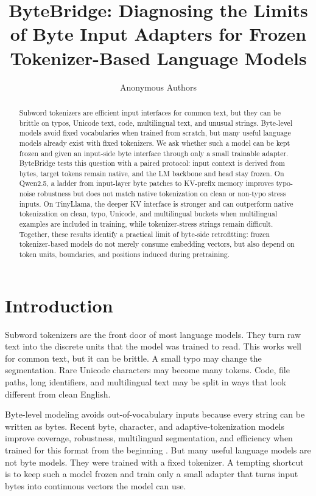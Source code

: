\documentclass[runningheads]{llncs}
\title{ByteBridge: Diagnosing the Limits of Byte Input Adapters for Frozen Tokenizer-Based Language Models}
\author{Anonymous Authors}
\institute{Paper under double-anonymous review}
\begin{document}
\maketitle

\begin{abstract}
Subword tokenizers are efficient input interfaces for common text, but they can be brittle on typos, Unicode text, code, multilingual text, and unusual strings. Byte-level models avoid fixed vocabularies when trained from scratch, but many useful language models already exist with fixed tokenizers. We ask whether such a model can be kept frozen and given an input-side byte interface through only a small trainable adapter. ByteBridge tests this question with a paired protocol: input context is derived from bytes, target tokens remain native, and the LM backbone and head stay frozen. On Qwen2.5, a ladder from input-layer byte patches to KV-prefix memory improves typo-noise robustness but does not match native tokenization on clean or non-typo stress inputs. On TinyLlama, the deeper KV interface is stronger and can outperform native tokenization on clean, typo, Unicode, and multilingual buckets when multilingual examples are included in training, while tokenizer-stress strings remain difficult. Together, these results identify a practical limit of byte-side retrofitting: frozen tokenizer-based models do not merely consume embedding vectors, but also depend on token units, boundaries, and positions induced during pretraining.

\end{abstract}

\section{Introduction}

Subword tokenizers are the front door of most language models. They turn raw text into the discrete units that the model was trained to read. This works well for common text, but it can be brittle. A small typo may change the segmentation. Rare Unicode characters may become many tokens. Code, file paths, long identifiers, and multilingual text may be split in ways that look different from clean English.

Byte-level modeling avoids out-of-vocabulary inputs because every string can be written as bytes. Recent byte, character, and adaptive-tokenization models improve coverage, robustness, multilingual segmentation, and efficiency when trained for this format from the beginning \cite{ahia2024magnet,clark2022canine,kallini2025mrt5,pagnoni2025byte,slagle2024spacebyte,tay2022charformer,xue2022byt5,yu2023megabyte}. But many useful language models are not byte models. They were trained with a fixed tokenizer. A tempting shortcut is to keep such a model frozen and train only a small adapter that turns input bytes into continuous vectors the model can use.
\end{document}
